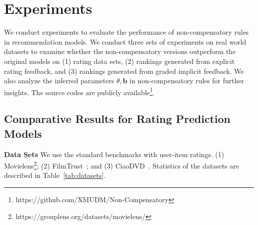 \documentclass[letterpaper]{article} %
\begin{document}
\section{Experiments}\label{sec:experiment}
We conduct experiments to evaluate the performance of non-compensatory rules in recommendation models. We conduct three sets of experiments on real world datasets to examine whether the non-compensatory versions outperform the original models on (1) rating data sets, (2) rankings generated from explicit rating feedback, and (3) rankings generated from graded implicit feedback. We also analyze the inferred parameters $\theta,\mathbf{b}$ in non-compensatory rules for further insights. The source codes are publicly available\footnote{https://github.com/XMUDM/Non-Compensatory}.

\subsection{Comparative Results for Rating Prediction Models}

\textbf{Data Sets} We use the standard benchmarks with user-item ratings. (1) Movielens\footnote{https://grouplens.org/datasets/movielens/}; (2) FilmTrust~\cite{Guo2013Novel}; and (3) CiaoDVD~\cite{Guo2014ETAF}. Statistics of the datasets are described in Table~\ref{tab:datasets}. 
\end{document}
